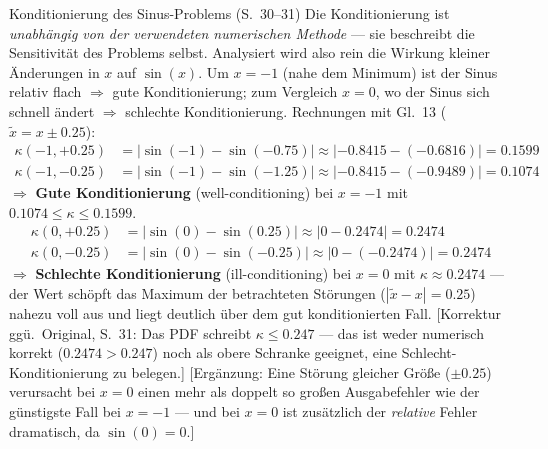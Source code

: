 \begin{bspbox}{Konditionierung des Sinus-Problems (S.~30--31)}
Die Konditionierung ist \emph{unabhängig von der verwendeten numerischen Methode} — sie beschreibt die Sensitivität des Problems selbst. Analysiert wird also rein die Wirkung kleiner Änderungen in $x$ auf $\sin(x)$. Um $x=-1$ (nahe dem Minimum) ist der Sinus relativ flach $\Rightarrow$ gute Konditionierung; zum Vergleich $x=0$, wo der Sinus sich schnell ändert $\Rightarrow$ schlechte Konditionierung. Rechnungen mit Gl.~13 ($\tilde{x} = x \pm 0.25$):
\begin{align*}
\kappa(-1, +0.25) &= |\sin(-1) - \sin(-0.75)| \approx |-0.8415 - (-0.6816)| = 0.1599 \\
\kappa(-1, -0.25) &= |\sin(-1) - \sin(-1.25)| \approx |-0.8415 - (-0.9489)| = 0.1074
\end{align*}
$\Rightarrow$ \textbf{Gute Konditionierung} (well-conditioning) bei $x=-1$ mit $0.1074 \leq \kappa \leq 0.1599$.
\begin{align*}
\kappa(0, +0.25) &= |\sin(0) - \sin(0.25)| \approx |0 - 0.2474| = 0.2474 \\
\kappa(0, -0.25) &= |\sin(0) - \sin(-0.25)| \approx |0 - (-0.2474)| = 0.2474
\end{align*}
$\Rightarrow$ \textbf{Schlechte Konditionierung} (ill-conditioning) bei $x=0$ mit $\kappa \approx 0.2474$ — der Wert schöpft das Maximum der betrachteten Störungen ($|\tilde{x}-x| = 0.25$) nahezu voll aus und liegt deutlich über dem gut konditionierten Fall. [Korrektur ggü.\ Original, S.~31: Das PDF schreibt \glqq$\kappa \leq 0.247$\grqq{} — das ist weder numerisch korrekt ($0.2474 > 0.247$) noch als obere Schranke geeignet, eine Schlecht-Konditionierung zu belegen.] [Ergänzung: Eine Störung gleicher Größe ($\pm 0.25$) verursacht bei $x=0$ einen mehr als doppelt so großen Ausgabefehler wie der günstigste Fall bei $x=-1$ — und bei $x=0$ ist zusätzlich der \emph{relative} Fehler dramatisch, da $\sin(0)=0$.]
\end{bspbox}

